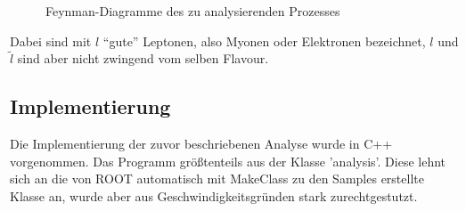 \begin{figure}[h!]
\begin{minipage}{0.49\textwidth}
  \end{minipage}
  \caption{Feynman-Diagramme des zu analysierenden Prozesses}
  \label{fig:feynman}
\end{figure}
Dabei sind mit $l$ "`gute"' Leptonen, also Myonen oder Elektronen bezeichnet,
$l$ und $\tilde l$ sind aber nicht zwingend vom selben Flavour.

\subsection{Implementierung}
Die Implementierung der zuvor beschriebenen Analyse wurde in C++ vorgenommen.
Das Programm größtenteils aus der Klasse 'analysis'. Diese lehnt sich an die von
ROOT automatisch mit MakeClass zu den Samples erstellte Klasse an, wurde aber
aus Geschwindigkeitsgründen stark zurechtgestutzt.

